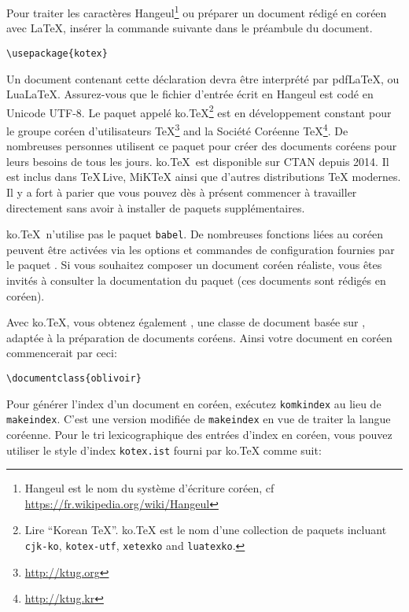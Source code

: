 Pour traiter les caractères Hangeul\footnote{Hangeul est le nom du
  système d'écriture coréen, cf
  \url{https://fr.wikipedia.org/wiki/Hangeul}} ou préparer un document
rédigé en coréen avec \LaTeX, insérer la commande suivante dans le
préambule du document.

\begin{lscommand}
\verb|\usepackage{kotex}|
\end{lscommand}

Un document contenant cette déclaration devra être interprété par
pdf\LaTeX,  ou Lua\LaTeX{}. Assurez-vous que le
fichier d'entrée écrit en Hangeul est codé en Unicode UTF-8. Le paquet
appelé ko.\TeX\footnote{Lire ``Korean \TeX{}''. ko.\TeX{} est le nom
  d'une collection de paquets incluant \texttt{cjk-ko},
  \texttt{kotex-utf}, \texttt{xetexko} and \texttt{luatexko}.} est
en développement constant pour le groupe coréen d'utilisateurs
\TeX{}\footnote{\url{http://ktug.org}} and la Société Coréenne
\TeX{}\footnote{\url{http://ktug.kr}}. De nombreuses personnes
utilisent ce paquet pour créer des documents coréens pour leurs
besoins de tous les jours. ko.\TeX\ est disponible sur CTAN depuis
2014. Il est inclus dans \TeX\,Live, MiK\TeX{} ainsi que d'autres
distributions \TeX{} modernes. Il y a fort à parier que vous pouvez
dès à présent commencer à travailler directement sans avoir à
installer de paquets supplémentaires.

ko.\TeX\ n'utilise pas le paquet \texttt{babel}. De nombreuses
fonctions liées au coréen peuvent être activées via les options et
commandes de configuration fournies par le paquet . Si vous
souhaitez composer un document coréen réaliste, vous êtes invités à
consulter la documentation du paquet (ces documents sont rédigés en
coréen).

Avec ko.\TeX, vous obtenez également , une classe de
document basée sur , adaptée à la préparation de documents
coréens. Ainsi votre document en coréen commencerait par ceci:

\begin{lscommand}
\verb|\documentclass{oblivoir}|
\end{lscommand}

Pour générer l'index d'un document en coréen, exécutez
\texttt{komkindex} au lieu de \texttt{makeindex}. C'est une version
modifiée de \texttt{makeindex} en vue de traiter la langue
coréenne. Pour le tri lexicographique des entrées d'index en coréen,
vous pouvez utiliser le style d'index \texttt{kotex.ist} fourni par
ko.\TeX{} comme suit:



